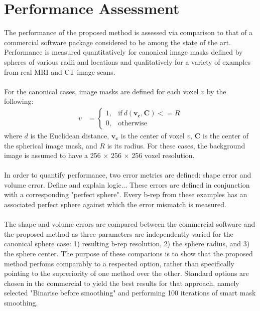 \section{Performance Assessment}
%

The performance of the proposed method is assessed via comparison to that of a commercial software package considered to be among the state of the art. Performance is measured quantitatively for canonical image masks defined by spheres of various radii and locations and qualitatively for a variety of examples from real MRI and CT image scans. \\ \\
%
For the canonical cases, image masks are defined for each voxel ${v}$ by the following:
\begin{align} 
	v &=  \begin{cases}
		1, & \text{if}\ d \left(\bm{v_c},\bm{C}\right) <= R \\
		0, & \text{otherwise}
	\end{cases}
\end{align}
where $d$ is the Euclidean distance, $\bm{v_c}$ is the center of voxel $v$, $\bm{C}$ is the center of the spherical image mask, and $R$ is its radius. For these cases, the background image is assumed to have a 256 $\times$ 256 $\times$ 256 voxel resolution. \\ \\
%
In order to quantify performance, two error metrics are defined: shape error and volume error. Define and explain logic... These errors are defined in conjunction with a corresponding "perfect sphere". Every b-rep from these examples has an associated perfect sphere against which the error mismatch is measured.\\ \\
%
The shape and volume errors are compared between the commercial software and the proposed method as three parameters are independently varied for the canonical sphere case: 1) resulting b-rep resolution, 2) the sphere radius, and 3) the sphere center. The purpose of these comparions is to show that the proposed method perfoms comparably to a respected option, rather than specifically pointing to the supreriority of one method over the other. Standard options are chosen in the commercial to yield the best results for that approach, namely selected "Binarise before smoothing" and performing 100 iterations of smart mask smoothing. \\ \\
%
